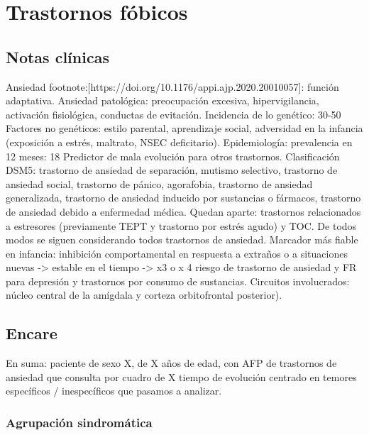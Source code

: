 \chapter*{Trastornos fóbicos}
\section*{Notas clínicas}
Ansiedad footnote:[https://doi.org/10.1176/appi.ajp.2020.20010057]: función adaptativa.
Ansiedad patológica: preocupación excesiva, hipervigilancia, activación fisiológica, conductas de evitación.
Incidencia de lo genético: 30-50%
Factores no genéticos: estilo parental, aprendizaje social, adversidad en la infancia (exposición a estrés, maltrato, NSEC deficitario).
Epidemiología: prevalencia en 12 meses: 18%
Predictor de mala evolución para otros trastornos.
Clasificación DSM5: trastorno de ansiedad de separación, mutismo selectivo, trastorno de ansiedad social, trastorno de pánico, agorafobia, trastorno de ansiedad generalizada, trastorno de ansiedad inducido por sustancias o fármacos, trastorno de ansiedad debido a enfermedad médica.
Quedan aparte: trastornos relacionados a estresores (previamente TEPT y trastorno por estrés agudo) y TOC.
De todos modos se siguen considerando todos trastornos de ansiedad.
Marcador más fiable en infancia: inhibición comportamental en respuesta a extraños o a situaciones nuevas -> estable en el tiempo -> x3 o x 4 riesgo de trastorno de ansiedad y FR para depresión y trastornos por consumo de sustancias.
Circuitos involucrados: núcleo central de la amígdala y corteza orbitofrontal posterior).
\section*{Encare}
En suma: paciente de sexo X, de X años de edad, con AFP de trastornos de ansiedad que consulta por cuadro de X tiempo de evolución centrado en temores específicos / inespecíficos que pasamos a analizar.
\subsection*{Agrupación sindromática}
